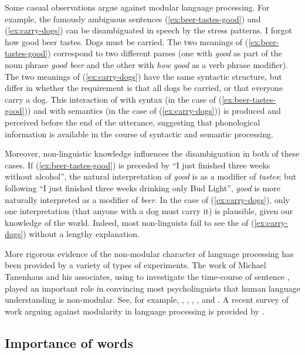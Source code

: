 \documentclass[output=paper
	        ,collection
	        ,collectionchapter
 	        ,biblatex
                ,babelshorthands
                ,newtxmath
                ,draftmode
                ,colorlinks, citecolor=brown
]{langscibook}
\begin{document}
Some casual observations argue against modular language processing.  For example, the famously ambiguous sentences (\ref{ex:beer-tastes-good}) and (\ref{ex:carry-dogs}) can be disambiguated in speech by the stress patterns.
\eal
\ex I forgot how good beer tastes.\label{ex:beer-tastes-good}
\ex Dogs must be carried.\label{ex:carry-dogs}
\zl
The two meanings of (\ref{ex:beer-tastes-good}) correspond to two different parses (one with \emph{good} as part of the noun phrase \emph{good beer} and the other with \emph{how good} as a verb phrase modifier).  The two meanings of (\ref{ex:carry-dogs}) have the same syntactic structure, but differ in whether the requirement is that all dogs be carried, or that everyone carry a dog.  This interaction of  with syntax (in the case of (\ref{ex:beer-tastes-good})) and with semantics (in the case of (\ref{ex:carry-dogs})) is produced and perceived before the end of the utterance, suggesting that phonological information is available in the course of syntactic and semantic processing.  

Moreover, non-linguistic knowledge influences the disambiguation in both of these cases.  If (\ref{ex:beer-tastes-good}) is preceded by ``I just finished three weeks without alcohol'', the natural interpretation of \emph{good} is as a modifier of \emph{tastes}; but following ``I just finished three weeks drinking only Bud Light'', \emph{good} is more naturally interpreted as a modifier of \emph{beer}.  In the case of (\ref{ex:carry-dogs}), only one interpretation (that anyone with a dog must carry it) is plausible, given our knowledge of the world.  Indeed, most non-linguists fail to see the  of (\ref{ex:carry-dogs}) without a lengthy explanation.  

More rigorous evidence of the non-modular character of language processing has been provided by a variety of types of experiments.  The work of Michael Tanenhaus  and his associates, using  to investigate the time-course of sentence , played an important role in convincing most psycholinguists that human language understanding is non-modular.  See, for example, \citet{EberhardEtal95}, \citet{McMurrayEtal2008}, \citet{TSKES95a}, \citet{TSKES96a}, and \citet{TanenhausTrueswell95}. A recent survey of work arguing against modularity in language processing is provided by \citet{SpevackEtal2018}.  

\subsection{Importance of words}
\label{sec-importance-of-words}
\end{document}
